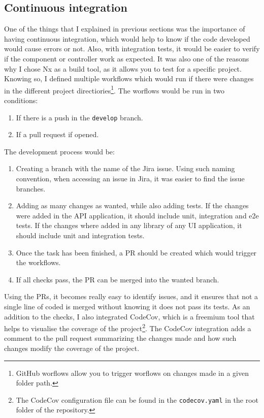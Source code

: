 \documentclass[a4paper, 12pt, oneside]{book}
\begin{document}
\subsection{Continuous integration}
One of the things that I explained in previous sections was the importance of having continuous integration, which would help to know if the code developed would cause errors or not. Also, with integration tests, it would be easier to verify if the component or controller work as expected. It was also one of the reasons why I chose Nx as a build tool, as it allows you to test for a specific project.
\\[8pt]
Knowing so, I defined multiple workflows \cite{github-workflows} which would run if there were changes in the different project directiories\footnote{GitHub worflows allow you to trigger worflows on changes made in a given folder path.}. The worflows would be run in two conditions:
\begin{enumerate}
	\item If there is a push in the \texttt{develop} branch.
	\item If a pull request if opened.
\end{enumerate}
The development process would be:
\begin{enumerate}
	\item Creating a branch with the name of the Jira issue. Using such naming convention, when accessing an issue in Jira, it was easier to find the issue branches.
	\item Adding as many changes as wanted, while also adding tests. If the changes were added in the API application, it should include unit, integration and e2e tests. If the changes where added in any library of any UI application, it should include unit and integration tests.
 \item Once the task has been finished, a PR should be created which would trigger the workflows.
 \item If all checks pass, the PR can be merged into the wanted branch.
\end{enumerate}
Using the PRs, it becomes really easy to identify issues, and it ensures that not a single line of coded is merged without knowing it does not pass its tests. As an addition to the checks, I also integrated CodeCov, which is a freemium tool that helps to visualise the coverage of the project\footnote{The CodeCov configuration file can be found in the \texttt{codecov.yaml} in the root folder of the repository.}. The CodeCov integration adds a comment to the pull request summarizing the changes made and how such changes modify the coverage of the project.
\end{document}

